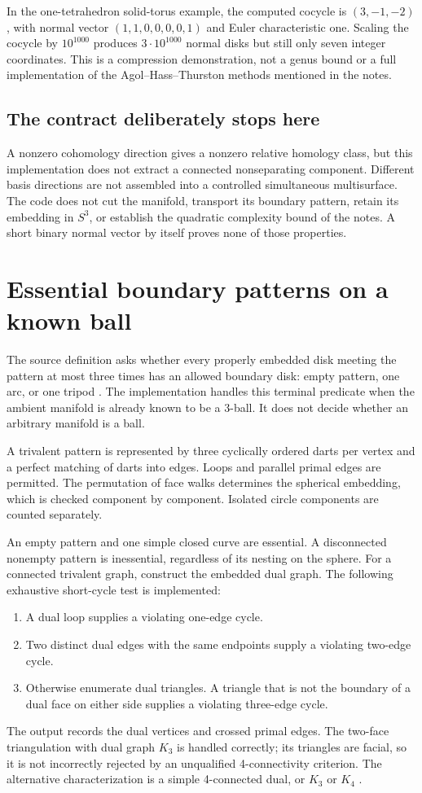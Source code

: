 \documentclass[11pt]{article}
\theoremstyle{remark}\newtheorem{remark}[theorem]{Remark}
\begin{document}
In the one-tetrahedron solid-torus example, the computed cocycle is
$(3,-1,-2)$, with normal vector $(1,1,0,0,0,0,1)$ and Euler characteristic one.
Scaling the cocycle by $10^{1000}$ produces $3\cdot10^{1000}$ normal disks but
still only seven integer coordinates. This is a compression demonstration,
not a genus bound or a full implementation of the Agol--Hass--Thurston methods
mentioned in the notes.

\subsection{The contract deliberately stops here}
A nonzero cohomology direction gives a nonzero relative homology class, but
this implementation does not extract a connected nonseparating component.
Different basis directions are not assembled into a controlled simultaneous
multisurface. The code does not cut the manifold, transport its boundary
pattern, retain its embedding in $S^3$, or establish the quadratic complexity
bound of the notes. A short binary normal vector by itself proves none of
those properties.

\section{Essential boundary patterns on a known ball}
The source definition asks whether every properly embedded disk meeting the
pattern at most three times has an allowed boundary disk: empty pattern,
one arc, or one tripod \cite[pp.~24--25]{slides}. The implementation handles
this terminal predicate when the ambient manifold is already known to be a
3-ball. It does not decide whether an arbitrary manifold is a ball.

A trivalent pattern is represented by three cyclically ordered darts per
vertex and a perfect matching of darts into edges. Loops and parallel primal
edges are permitted. The permutation of face walks determines the spherical
embedding, which is checked component by component. Isolated circle components
are counted separately.

An empty pattern and one simple closed curve are essential. A disconnected
nonempty pattern is inessential, regardless of its nesting on the sphere.
For a connected trivalent graph, construct the embedded dual graph. The
following exhaustive short-cycle test is implemented:
\begin{enumerate}
\item A dual loop supplies a violating one-edge cycle.
\item Two distinct dual edges with the same endpoints supply a violating
two-edge cycle.
\item Otherwise enumerate dual triangles. A triangle that is not the boundary
of a dual face on either side supplies a violating three-edge cycle.
\end{enumerate}
The output records the dual vertices and crossed primal edges. The two-face
triangulation with dual graph $K_3$ is handled correctly; its triangles are
facial, so it is not incorrectly rejected by an unqualified 4-connectivity
criterion. The alternative characterization is a simple 4-connected dual,
or $K_3$ or $K_4$ \cite[Proposition~2.6]{lackenby2026}.
\end{document}
